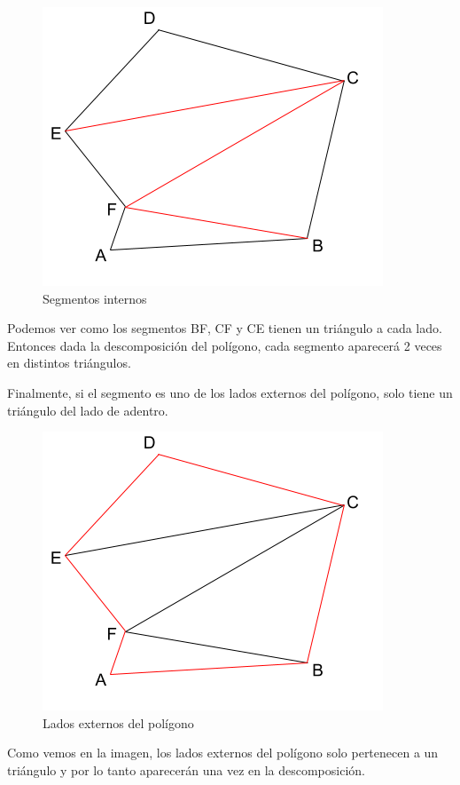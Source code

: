 \begin{figure}[H]\centering\includegraphics[scale=0.5]{Imagenes/ej1/Imagen_B.png}\caption{Segmentos internos}\end{figure}

Podemos ver como los segmentos BF, CF y CE tienen un triángulo a cada lado. Entonces dada la descomposición del polígono, cada segmento aparecerá 2 veces en distintos triángulos.

Finalmente, si el segmento es uno de los lados externos del polígono, solo tiene un triángulo del lado de adentro.

\begin{figure}[H]\centering\includegraphics[scale=0.5]{Imagenes/ej1/Imagen_C.png}\caption{Lados externos del polígono}\end{figure}

Como vemos en la imagen, los lados externos del polígono solo pertenecen a un triángulo y por lo tanto aparecerán una vez en la descomposición.

